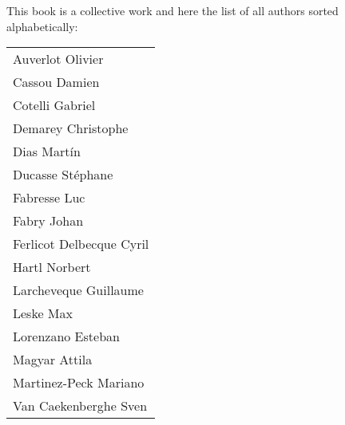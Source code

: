 \documentclass[10pt,twoside]{root/support/latex/sbabook}
\begin{document}
This book is a collective work and here the list of all authors sorted alphabetically:

\begin{tabular}{l}
Auverlot Olivier  \\
Cassou Damien\\
Cotelli Gabriel\\
Demarey Christophe\\
Dias Martín\\
Ducasse Stéphane\\
Fabresse Luc\\
Fabry Johan\\
Ferlicot Delbecque Cyril\\
Hartl Norbert\\
Larcheveque Guillaume\\
Leske Max\\
Lorenzano Esteban\\
Magyar Attila\\
Martinez-Peck Mariano\\
Van Caekenberghe Sven\\
\end{tabular}

\backmatter
\end{document}
